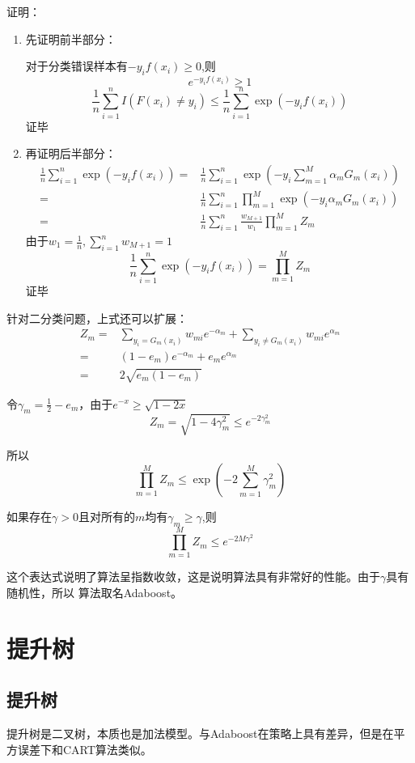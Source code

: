 \documentclass{article}
\begin{document}
        证明：
        \begin{enumerate}
            \item 先证明前半部分：
            
            对于分类错误样本有$-y_if(x_i)\ge 0$,则
            \[e^{-y_if(x_i)}\ge 1\]
            \[\frac{1}{n}\sum_{i=1}^{n}I(F(x_i)\neq y_i)\le \frac{1}{n}\sum_{i=1}^{n}\exp(-y_if(x_i))\]
            证毕
            \item 再证明后半部分：
            \begin{align*}
                \frac{1}{n}\sum_{i=1}^{n}\exp(-y_if(x_i))=&\frac{1}{n}\sum_{i=1}^{n}\exp(-y_i\sum_{m=1}^{M}\alpha_mG_m(x_i))\\
                =&\frac{1}{n}\sum_{i=1}^{n}\prod_{m=1}^{M}\exp(-y_i\alpha_mG_m(x_i))\\
                =&\frac{1}{n}\sum_{i=1}^{n}\frac{w_{M+1}}{w_1}\prod_{m=1}^{M}Z_m
            \end{align*}
            由于$w_1=\frac{1}{n},\sum_{i=1}^{n}w_{M+1}=1$
            \[\frac{1}{n}\sum_{i=1}^{n}\exp(-y_if(x_i))=\prod_{m=1}^{M}Z_m\]
            证毕
        \end{enumerate}

        针对二分类问题，上式还可以扩展：
        \begin{align*}
            Z_m=&\sum_{y_i=G_m(x_i)}w_{mi}e^{-\alpha_m}+\sum_{y_i\neq G_m(x_i)}w_{mi}e^{\alpha_m}\\
            =&(1-e_m)e^{-\alpha_m}+e_me^{\alpha_m}\\
            =&2\sqrt{e_m(1-e_m)}
        \end{align*}
        
        令$\gamma_m=\frac{1}{2}-e_m$，由于$e^{-x}\ge\sqrt{1-2x}$
        \[Z_m=\sqrt{1-4\gamma_m^2}\le e^{-2\gamma_m^2}\]

        所以
        \[\prod_{m=1}^{M}Z_m\le \exp(-2\sum_{m=1}^{M}\gamma_m^2)\]

        如果存在$\gamma>0$且对所有的$m$均有$\gamma_m \ge \gamma$,则
        \[\prod_{m=1}^{M}Z_m\le e^{-2M\gamma^2}\]

        这个表达式说明了算法呈指数收敛，这是说明算法具有非常好的性能。由于$\gamma$具有随机性，所以
        算法取名Adaboost。

    \section{提升树}
        \subsection{提升树}
        提升树是二叉树，本质也是加法模型。与Adaboost在策略上具有差异，但是在平方误差下和CART算法类似。
\end{document}
